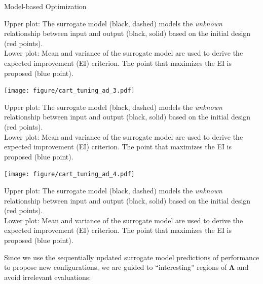 \begin{vbframe}{Model-based Optimization}
\begin{knitrout}
\end{knitrout}
  \begin{footnotesize}
Upper plot: The surrogate model (black, dashed) models the \emph{unknown} relationship between input and output (black, solid) based on the initial design (red points).\\
Lower plot: Mean and variance of the surrogate model are used to derive the expected improvement (EI) criterion. The point that maximizes the EI is proposed (blue point). 
\end{footnotesize}
\framebreak

\begin{knitrout}\scriptsize
{}\color{fgcolor}

{\centering \texttt{[image: figure/cart\_tuning\_ad\_3.pdf]} 
}


\end{knitrout}
  \begin{footnotesize}
Upper plot: The surrogate model (black, dashed) models the \emph{unknown} relationship between input and output (black, solid) based on the initial design (red points).\\
Lower plot: Mean and variance of the surrogate model are used to derive the expected improvement (EI) criterion. The point that maximizes the EI is proposed (blue point). 
\end{footnotesize}
\framebreak

\begin{knitrout}\scriptsize
{}\color{fgcolor}

{\centering \texttt{[image: figure/cart\_tuning\_ad\_4.pdf]} 
}


\end{knitrout}
  \begin{footnotesize}
Upper plot: The surrogate model (black, dashed) models the \emph{unknown} relationship between input and output (black, solid) based on the initial design (red points).\\
Lower plot: Mean and variance of the surrogate model are used to derive the expected improvement (EI) criterion. The point that maximizes the EI is proposed (blue point). 
\end{footnotesize}
\framebreak

Since we use the sequentially updated surrogate model predictions of performance to propose new configurations,
we are guided to \enquote{interesting} regions of $\bm{\Lambda}$ and avoid irrelevant evaluations:
  

\end{vbframe}
